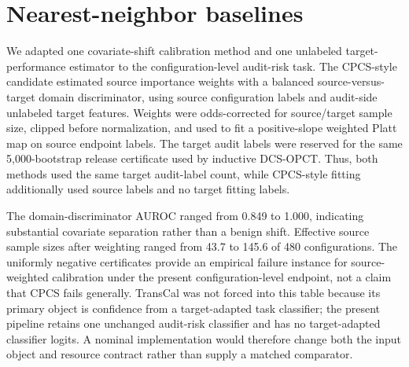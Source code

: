 \documentclass[preprint,12pt]{elsarticle}
\begin{document}
\section{Nearest-neighbor baselines}

We adapted one covariate-shift calibration method and one unlabeled target-performance estimator to the configuration-level audit-risk task. The CPCS-style candidate estimated source importance weights with a balanced source-versus-target domain discriminator, using source configuration labels and audit-side unlabeled target features. Weights were odds-corrected for source/target sample size, clipped before normalization, and used to fit a positive-slope weighted Platt map on source endpoint labels. The target audit labels were reserved for the same 5,000-bootstrap release certificate used by inductive DCS-OPCT. Thus, both methods used the same target audit-label count, while CPCS-style fitting additionally used source labels and no target fitting labels.

\begin{table}[!htbp]
\centering
\caption{Full-budget inductive DCS-OPCT versus the CPCS-style source-weighted candidate. CPCS gain is zero because every candidate failed the common certificate and returned the original probability.}
\label{tab:cpcs-style}
\small
{}
\end{table}

The domain-discriminator AUROC ranged from 0.849 to 1.000, indicating substantial covariate separation rather than a benign shift. Effective source sample sizes after weighting ranged from 43.7 to 145.6 of 480 configurations. The uniformly negative certificates provide an empirical failure instance for source-weighted calibration under the present configuration-level endpoint, not a claim that CPCS fails generally. TransCal was not forced into this table because its primary object is confidence from a target-adapted task classifier; the present pipeline retains one unchanged audit-risk classifier and has no target-adapted classifier logits. A nominal implementation would therefore change both the input object and resource contract rather than supply a matched comparator.
\end{document}
